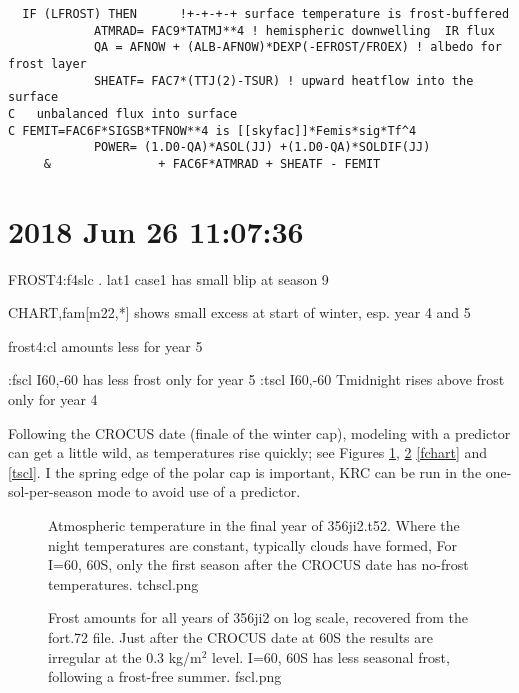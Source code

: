 \documentclass{article}
\begin{document}
\vspace{-3.mm} 
\begin{verbatim}
  IF (LFROST) THEN      !+-+-+-+ surface temperature is frost-buffered
            ATMRAD= FAC9*TATMJ**4 ! hemispheric downwelling  IR flux
            QA = AFNOW + (ALB-AFNOW)*DEXP(-EFROST/FROEX) ! albedo for frost layer
            SHEATF= FAC7*(TTJ(2)-TSUR) ! upward heatflow into the surface
C   unbalanced flux into surface
C FEMIT=FAC6F*SIGSB*TFNOW**4 is [[skyfac]]*Femis*sig*Tf^4
            POWER= (1.D0-QA)*ASOL(JJ) +(1.D0-QA)*SOLDIF(JJ)
     &               + FAC6F*ATMRAD + SHEATF - FEMIT
\end{verbatim}  
 
\clearpage
\section{2018 Jun 26 11:07:36} %

FROST4:f4slc  . lat1 case1 has small blip at season 9

CHART,fam[m22,*] shows small excess  at start of winter, esp. year 4 and 5

 frost4:cl  amounts less for year 5

:fscl  I60,-60 has less frost only for year 5
:tscl  I60,-60 Tmidnight rises above frost only for year 4

Following the CROCUS date (finale of the winter cap), modeling with a predictor
can get a little wild, as temperatures rise quickly; see Figures \ref{tchscl},
\ref{fscl} \ref{fchart} and \ref{tscl}. I the spring edge of the polar cap is
important, KRC can be run in the one-sol-per-season mode to avoid use of a
predictor.

\begin{figure}[!ht] 
\caption[Tatm in v356]{Atmospheric temperature in the final year of
  356ji2.t52. Where the night temperatures are constant, typically clouds have
  formed, For I=60, 60S, only the first season after the CROCUS date has
  no-frost temperatures.
\label{tchscl}  tchscl.png }
\end{figure} 

\begin{figure}[!ht] 
\caption[Frost in test printout]{Frost amounts for all years of 356ji2 on log
  scale, recovered from the fort.72 file. Just after the CROCUS date at 60S the
  results are irregular at the 0.3 kg/m$^2$ level. I=60, 60S has less seasonal
  frost, following a frost-free summer.
\label{fscl}  fscl.png }
\end{figure} 
\end{document}

